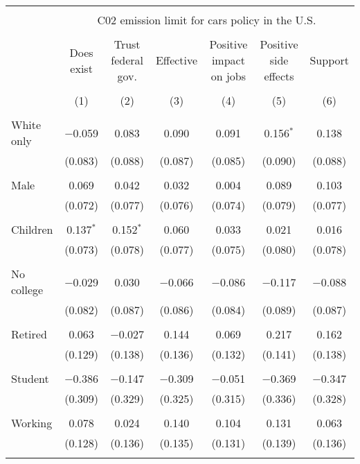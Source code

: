 
\begin{tabular}{@{\extracolsep{5pt}}lcccccc} 
\\[-1.8ex]\hline 
\hline \\[-1.8ex] 
 & \multicolumn{6}{c}{C02 emission limit for cars policy in the U.S.} \\ 
\cline{2-7} 
\\[-1.8ex] & Does exist & Trust federal gov. & Effective & Positive impact on jobs & Positive side effects & Support \\ 
\\[-1.8ex] & (1) & (2) & (3) & (4) & (5) & (6)\\ 
\hline \\[-1.8ex] 
 White only & $-$0.059 & 0.083 & 0.090 & 0.091 & 0.156$^{*}$ & 0.138 \\ 
  & (0.083) & (0.088) & (0.087) & (0.085) & (0.090) & (0.088) \\ 
  & & & & & & \\ 
 Male & 0.069 & 0.042 & 0.032 & 0.004 & 0.089 & 0.103 \\ 
  & (0.072) & (0.077) & (0.076) & (0.074) & (0.079) & (0.077) \\ 
  & & & & & & \\ 
 Children & 0.137$^{*}$ & 0.152$^{*}$ & 0.060 & 0.033 & 0.021 & 0.016 \\ 
  & (0.073) & (0.078) & (0.077) & (0.075) & (0.080) & (0.078) \\ 
  & & & & & & \\ 
 No college & $-$0.029 & 0.030 & $-$0.066 & $-$0.086 & $-$0.117 & $-$0.088 \\ 
  & (0.082) & (0.087) & (0.086) & (0.084) & (0.089) & (0.087) \\ 
  & & & & & & \\ 
 Retired & 0.063 & $-$0.027 & 0.144 & 0.069 & 0.217 & 0.162 \\ 
  & (0.129) & (0.138) & (0.136) & (0.132) & (0.141) & (0.138) \\ 
  & & & & & & \\ 
 Student & $-$0.386 & $-$0.147 & $-$0.309 & $-$0.051 & $-$0.369 & $-$0.347 \\ 
  & (0.309) & (0.329) & (0.325) & (0.315) & (0.336) & (0.328) \\ 
  & & & & & & \\ 
 Working & 0.078 & 0.024 & 0.140 & 0.104 & 0.131 & 0.063 \\ 
  & (0.128) & (0.136) & (0.135) & (0.131) & (0.139) & (0.136) \\ 
  & & & & & & \\ 

\end{tabular}
